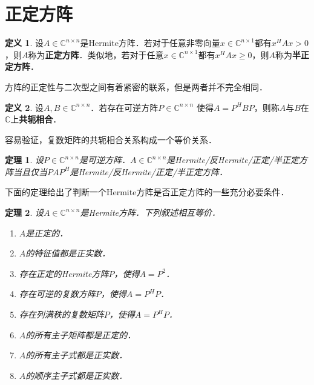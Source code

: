 \documentclass[a4paper,fontset=windows]{ctexbook}
\newtheorem{theorem}{定理}[chapter]
\theoremstyle{definition}
\newtheorem{definition}{定义}[chapter]
\renewcommand{\ge}{\geqslant}
\begin{document}
\clearpage\section{正定方阵}

\begin{definition}
设$A\in\mathbb{C}^{n\times n}$是Hermite方阵．若对于任意非零向量$x\in\mathbb{C}^{n\times 1}$都有$x^HAx>0$，则$A$称为{\bf 正定方阵}．类似地，若对于任意$x\in\mathbb{C}^{n\times 1}$都有$x^HAx\ge 0$，则$A$称为{\bf 半正定方阵}．
\end{definition}

方阵的正定性与二次型之间有着紧密的联系，但是两者并不完全相同．

\begin{definition}\label{def7.5}
设$A,B\in\mathbb{C}^{n\times n}$．若存在可逆方阵$P\in\mathbb{C}^{n\times n}$ 使得$A=P^HBP$，则称$A$与$B$在$\mathbb{C}$上{\bf 共轭相合}．
\end{definition}

容易验证，复数矩阵的共轭相合关系构成一个等价关系．

\begin{theorem}\label{thm7.3}
设$P\in\mathbb{C}^{n\times n}$是可逆方阵．$A\in\mathbb{C}^{n\times n}$是Hermite/反Hermite/正定/半正定方阵当且仅当$PAP^H$是Hermite/反Hermite/正定/半正定方阵．
\end{theorem}

下面的定理给出了判断一个Hermite方阵是否正定方阵的一些充分必要条件．

\begin{theorem}\label{thm7.4}
设$A\in\mathbb{C}^{n\times n}$是Hermite方阵．下列叙述相互等价．
\begin{enumerate}
\item $A$是正定的．
\item $A$的特征值都是正实数．
\item 存在正定的Hermite方阵$P$，使得$A=P^2$．
\item 存在可逆的复数方阵$P$，使得$A=P^HP$．
\item 存在列满秩的复数矩阵$P$，使得$A=P^HP$．
\item $A$的所有主子矩阵都是正定的．
\item $A$的所有主子式都是正实数．
\item $A$的顺序主子式都是正实数．
\end{enumerate}
\end{theorem}
\end{document}

